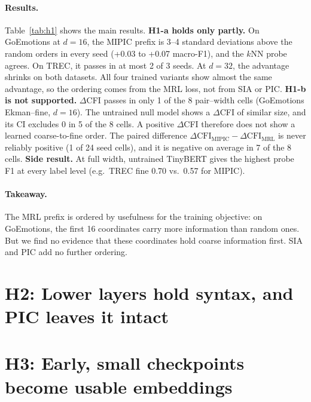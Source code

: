 \documentclass[11pt]{article}
\begin{document}
\paragraph{Results.}
Table~\ref{tab:h1} shows the main results.
\textbf{H1-a holds only partly.}
On GoEmotions at $d{=}16$, the MIPIC prefix is 3--4 standard deviations above the random orders in every seed (+0.03 to +0.07 macro-F1), and the $k$NN probe agrees.
On TREC, it passes in at most 2 of 3 seeds.
At $d{=}32$, the advantage shrinks on both datasets.
All four trained variants show almost the same advantage, so the ordering comes from the MRL loss, not from SIA or PIC.
\textbf{H1-b is not supported.}
$\Delta$CFI passes in only 1 of the 8 pair--width cells (GoEmotions Ekman--fine, $d{=}16$).
The untrained null model shows a $\Delta$CFI of similar size, and its CI excludes 0 in 5 of the 8 cells.
A positive $\Delta$CFI therefore does not show a learned coarse-to-fine order.
The paired difference $\Delta\text{CFI}_{\text{MIPIC}}-\Delta\text{CFI}_{\text{MRL}}$ is never reliably positive (1 of 24 seed cells), and it is negative on average in 7 of the 8 cells.
\textbf{Side result.} At full width, untrained TinyBERT gives the highest probe F1 at every label level (e.g.\ TREC fine 0.70 vs.\ 0.57 for MIPIC).

\paragraph{Takeaway.}
The MRL prefix is ordered by usefulness for the training objective: on GoEmotions, the first 16 coordinates carry more information than random ones.
But we find no evidence that these coordinates hold coarse information first.
SIA and PIC add no further ordering.

\section{H2: Lower layers hold syntax, and PIC leaves it intact}
\label{sec:h2}

\section{H3: Early, small checkpoints become usable embeddings}
\label{sec:h3}
\end{document}
